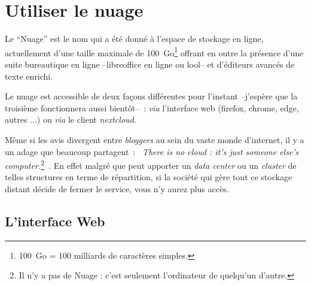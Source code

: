 \chapter{Utiliser le nuage}

Le ``Nuage'' est le nom qui a été donné à l'espace de stockage en ligne, actuellement d'une taille maximale de 100~Go\footnote{%
100~Go = 100 milliards de caractères simples.
} 
offrant en outre la présence d'une suite bureautique en ligne --libreoffice en ligne ou lool-- et d'éditeurs avancés de texte enrichi.

Le nuage est accessible de deux façons différentes pour l'instant --j'espère que la troisième fonctionnera aussi bientôt--~: \emph{via} l'interface web (firefox, chrome, edge, autres ...) ou \emph{via} le client \emph{nextcloud}.

Même si les avis divergent entre \emph{bloggers\/} au sein du vaste monde d'internet, il y a un adage que beaucoup partagent~: \og~\emph{There is no cloud : it's just someone else's computer.\/}\footnote{Il n'y a pas de Nuage : c'est seulement l'ordinateur de quelqu'un d'autre.}~\fg{}. 
En effet malgré que peut apporter un \emph{data center\/} ou un \emph{cluster} de telles structures en terme de répartition, si la société qui gère tout ce stockage distant décide de fermer le service, vous n'y aurez plus accès.

\section{L'interface Web}

